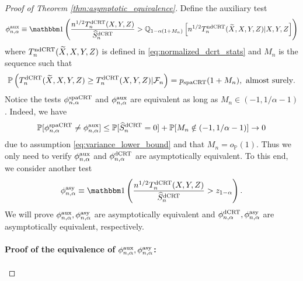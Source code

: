 \documentclass[12pt]{article}
\theoremstyle{definition}
\def\P{\mathbb{P}}
\def\P{\mathbb{P}}
\renewcommand{\P}{\mathbb{P}}							%
\newcommand{\Q}{\mathbb{Q}}								%
\newcommand{\indicator}{\mathbbm 1}						%
\newcommand{\srx}{X}									%
\newcommand{\srz}{Z}									%
\newcommand{\srxk}{\widetilde X}						%
\newcommand{\sry}{Y}									%
\newcommand{\dCRT}{\textnormal{dCRT}} 					%
\newcommand{\ndCRThat}{\textnormal{ndCRT}}	%
\newcommand{\spacrt}{\textnormal{spaCRT}}               %
\newcommand{\aux}{\textnormal{aux}}               %
\newcommand{\asy}{\textnormal{asy}}              %
\begin{document}
  \begin{proof}[Proof of Theorem \ref{thm:asymptotic_equivalence}]
	Define the auxiliary test 
	  \begin{align*}
		  \phi^{\aux}_{n,\alpha}\equiv \indicator\left(\frac{n^{1/2}T_n^{\dCRT}(\srx,\sry,\srz)}{\widehat{S}_n^{\dCRT}}>\Q_{1-\alpha(1+M_n)}\left[n^{1/2}T_n^{\ndCRThat}(\widetilde{X},X,Y,Z)|X,Y,Z\right]\right)
	  \end{align*}
	where $T_n^{\ndCRThat}(\srxk,\srx,\sry,\srz)$ is defined in \eqref{eq:normalized_dcrt_stats} and $M_n$ is the sequence such that
	\begin{align*}
	  \P\left(T_n^{\dCRT}(\srxk,\srx,\sry,\srz)\geq T_n^{\dCRT}(\srx,\sry,\srz)|\mathcal{F}_n\right)=p_{\spacrt}(1+M_n),\text{ almost surely}.
	\end{align*}
	  Notice the tests $\phi_{n,\alpha}^{\spacrt}$ and $\phi_{n,\alpha}^{\aux}$ are equivalent as long as $M_n \in (-1, 1/\alpha - 1)$. Indeed, we have 
	\begin{align*}
	  \P[\phi_{n,\alpha}^{\spacrt}\neq \phi_{n,\alpha}^{\aux}]\leq \P[\widehat S_n^{\dCRT}=0]+\P[M_n \notin (-1, 1/\alpha - 1)]\rightarrow0
	\end{align*}
	due to assumption \eqref{eq:variance_lower_bound} and that $M_n=o_{\P}(1)$. Thus we only need to verify $\phi_{n,\alpha}^{\aux}$ and $\phi_{n,\alpha}^{\dCRT}$ are asymptotically equivalent. To this end, we consider another test 
	  \begin{align*}
		  \phi_{n,\alpha}^{\asy}\equiv \indicator\left(\frac{n^{1/2}T_n^{\dCRT}(\srx,\sry,\srz)}{\widehat{S}_n^{\dCRT}}>z_{1-\alpha}\right).
	  \end{align*}
	We will prove $\phi_{n,\alpha}^{\aux},\phi_{n,\alpha}^{\asy}$ are asymptotically equivalent and $\phi_{n,\alpha}^{\dCRT},\phi_{n,\alpha}^{\asy}$ are asymptotically equivalent, respectively.
  
	\paragraph{Proof of the equivalence of $\phi_{n,\alpha}^{\aux},\phi_{n,\alpha}^{\asy}$:}
	

\end{proof}
\end{document}
